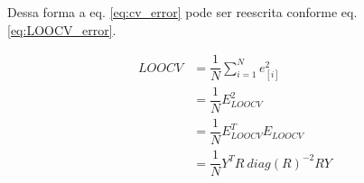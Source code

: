 Dessa forma a eq. \ref{eq:cv_error} pode ser reescrita conforme eq. \ref{eq:LOOCV_error}.

\begin{equation}
    \begin{split}
        LOOCV   &= \dfrac{1}{N} \sum_{i=1}^{N}e^2_{[i]} \\
                &= \dfrac{1}{N} E_{LOOCV}^2 \\
                &= \dfrac{1}{N}E_{LOOCV}^TE_{LOOCV} \\
                &= \dfrac{1}{N} Y^TR\ diag(R)^{-2}RY \\
    \end{split}
    \label{eq:LOOCV_error}
\end{equation}